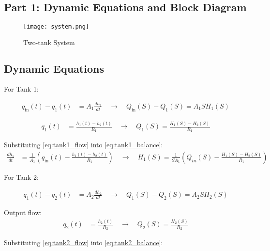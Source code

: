 \documentclass{report}
\begin{document}
\begin{flushleft}

\section*{Part 1: Dynamic Equations and Block Diagram}

\begin{figure}[H]
    \centering
    \texttt{[image: system.png]}
    \caption{Two-tank System}
    \label{fig:system}
\end{figure}

\subsection*{Dynamic Equations}
For Tank 1:

\begin{align}
    q_{\text{in}}(t) - q_{1}(t) &= A_1 \frac{dh_1}{dt}
    \quad \longrightarrow\quad Q_{\text{in}}(S) - Q_{1}(S) = A_1 SH_{1}(S) 
    \label{eq:tank1_balance}
\end{align}

\begin{align}
    q_{1}(t) &= \frac{h_1(t) - h_2(t)}{R_1}
        \quad \longrightarrow \quad  Q_{\text{1}}(S) = \frac{H_{1}(S) - H_{2}(S)}{R_{1}}
    \label{eq:tank1_flow}
\end{align}

Substituting \eqref{eq:tank1_flow} into \eqref{eq:tank1_balance}:
\begin{align}
    \frac{dh_1}{dt} &= \frac{1}{A_1} \left( q_{\text{in}}(t) - \frac{h_1(t) - h_2(t)}{R_1} \right)
     \quad \longrightarrow \quad  H_{\text{1}}(S) = \frac{1}{SA_{1}}\left( Q_{in}(S) - \frac{H_{1}(S) - H_{2}(S)}{R_{1}}\right)
    \label{eq:tank1_final}
\end{align}

For Tank 2:

\begin{align}
    q_{\text{1}}(t) - q_{2}(t) &= A_2 \frac{dh_2}{dt} \quad \longrightarrow\quad Q_{\text{1}}(S) - Q_{2}(S) = A_2 SH_{2}(S)
    \label{eq:tank2_balance}
\end{align}

Output flow:
\begin{align}
    q_{2}(t) &= \frac{h_2(t)}{R_2}\quad \longrightarrow \quad  Q_{\text{2}}(S) = \frac{H_{2}(S)}{R_{2}}
    \label{eq:tank2_flow}
\end{align}

Substituting \eqref{eq:tank2_flow} into \eqref{eq:tank2_balance}:


\end{flushleft}
\end{document}
